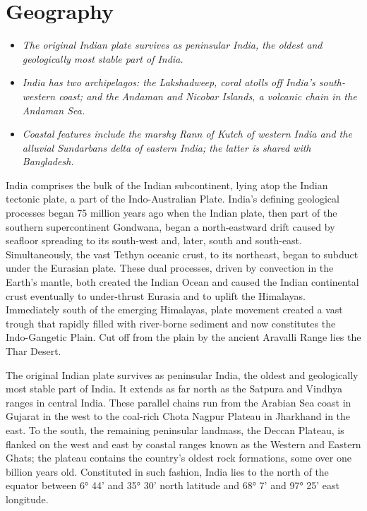 \section{Geography}\label{geography}

\begin{itemize}
\item
  \emph{The original Indian plate survives as peninsular India, the
  oldest and geologically most stable part of India.}
\item
  \emph{India has two archipelagos: the Lakshadweep, coral atolls off
  India's south-western coast; and the Andaman and Nicobar Islands, a
  volcanic chain in the Andaman Sea.}
\item
  \emph{Coastal features include the marshy Rann of Kutch of western
  India and the alluvial Sundarbans delta of eastern India; the latter
  is shared with Bangladesh.}
\end{itemize}

India comprises the bulk of the Indian subcontinent, lying atop the
Indian tectonic plate, a part of the Indo-Australian Plate. India's
defining geological processes began 75 million years ago when the Indian
plate, then part of the southern supercontinent Gondwana, began a
north-eastward drift caused by seafloor spreading to its south-west and,
later, south and south-east. Simultaneously, the vast Tethyn oceanic
crust, to its northeast, began to subduct under the Eurasian plate.
These dual processes, driven by convection in the Earth's mantle, both
created the Indian Ocean and caused the Indian continental crust
eventually to under-thrust Eurasia and to uplift the Himalayas.
Immediately south of the emerging Himalayas, plate movement created a
vast trough that rapidly filled with river-borne sediment and now
constitutes the Indo-Gangetic Plain. Cut off from the plain by the
ancient Aravalli Range lies the Thar Desert.

The original Indian plate survives as peninsular India, the oldest and
geologically most stable part of India. It extends as far north as the
Satpura and Vindhya ranges in central India. These parallel chains run
from the Arabian Sea coast in Gujarat in the west to the coal-rich Chota
Nagpur Plateau in Jharkhand in the east. To the south, the remaining
peninsular landmass, the Deccan Plateau, is flanked on the west and east
by coastal ranges known as the Western and Eastern Ghats; the plateau
contains the country's oldest rock formations, some over one billion
years old. Constituted in such fashion, India lies to the north of the
equator between 6° 44' and 35° 30' north latitude and 68° 7' and 97° 25'
east longitude.

